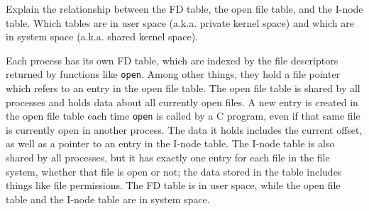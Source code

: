 Explain the relationship between the FD table, the open file table, and the I-node table. Which tables are in user space (a.k.a. private kernel space) and which are in system space (a.k.a. shared kernel space).

\begin{answer}
Each process has its own FD table, which are indexed by the file descriptors returned by functions like \texttt{open}.
Among other things, they hold a file pointer which refers to an entry in the open file table.
The open file table is shared by all processes and holds data about all currently open files.
A new entry is created in the open file table each time \texttt{open} is called by a C program,
even if that same file is currently open in another process.
The data it holds includes the current offset, as well as a pointer to an entry in the I-node table.
The I-node table is also shared by all processes,
but it has exactly one entry for each file in the file system,
whether that file is open or not;
the data stored in the table includes things like file permissions.
The FD table is in user space, while the open file table and the I-node table are in system space.
\end{answer}

